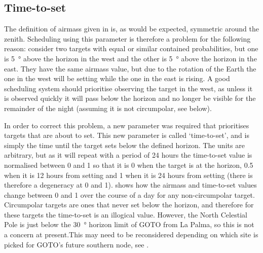 
\subsection{Time-to-set}
\label{sec:tts}
\begin{colsection}

The definition of airmass given in  is, as would be expected, symmetric around the zenith. Scheduling using this parameter is therefore a problem for the following reason: consider two targets with equal or similar contained probabilities, but one is \SI{5}{\degree} above the horizon in the west and the other is \SI{5}{\degree} above the horizon in the east. They have the same airmass value, but due to the rotation of the Earth the one in the west will be setting while the one in the east is rising. A good scheduling system should prioritise observing the target in the west, as unless it is observed quickly it will pass below the horizon and no longer be visible for the remainder of the night (assuming it is not circumpolar, see below).

In order to correct this problem, a new parameter was required that prioritises targets that are about to set. This new parameter is called `time-to-set', and is simply the time until the target sets below the defined horizon. The units are arbitrary, but as it will repeat with a period of 24 hours the time-to-set value is normalised between 0 and 1 so that it is 0 when the target is at the horizon, 0.5 when it is 12 hours from setting and 1 when it is 24 hours from setting (there is therefore a degeneracy at 0 and 1).  shows how the airmass and time-to-set values change between 0 and 1 over the course of a day for any non-circumpolar target. Circumpolar targets are ones that never set below the horizon, and therefore for these targets the time-to-set is an illogical value. However, the North Celestial Pole is just below the \SI{30}{\degree} horizon limit of GOTO from La Palma, so this is not a concern at present.\@ This may need to be reconsidered depending on which site is picked for GOTO's future southern node, see .


\end{colsection}
